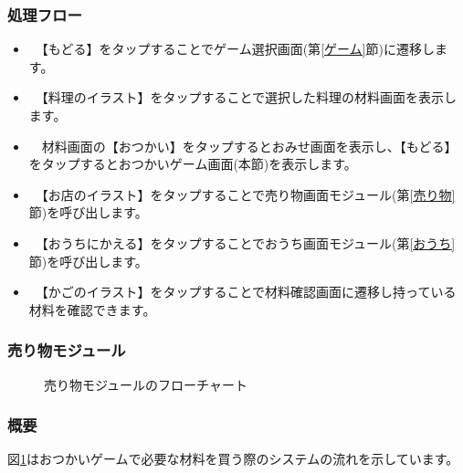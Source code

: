 \documentclass[a4j]{jarticle}
\begin{document}
\subsubsection*{処理フロー}
\begin{itemize}
\item　【もどる】をタップすることでゲーム選択画面(第\ref{ゲーム}節)に遷移します。
\item　【料理のイラスト】をタップすることで選択した料理の材料画面を表示します。
\item　材料画面の【おつかい】をタップするとおみせ画面を表示し、【もどる】をタップするとおつかいゲーム画面(本節)を表示します。
\item　【お店のイラスト】をタップすることで売り物画面モジュール(第\ref{売り物}節)を呼び出します。
\item　【おうちにかえる】をタップすることでおうち画面モジュール(第\ref{おうち}節)を呼び出します。
\item　【かごのイラスト】をタップすることで材料確認画面に遷移し持っている材料を確認できます。

\end{itemize}


\newpage
\subsubsection{売り物モジュール\label{売り物}}
\begin{figure}[H]
    \begin{center}
    \caption {売り物モジュールのフローチャート}
    \label{urimono}
    \end{center}
\end{figure}

\subsubsection*{概要}
図\ref{urimono}はおつかいゲームで必要な材料を買う際のシステムの流れを示しています。
\end{document}
